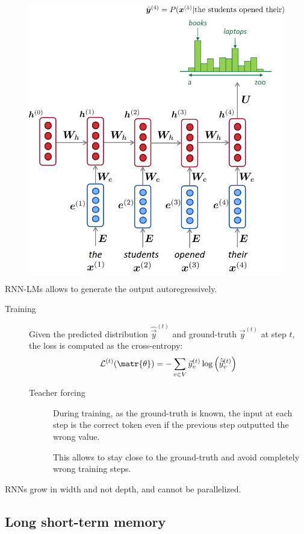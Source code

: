 \begin{description}
    \begin{figure}[H]
        \centering
        \includegraphics[width=0.4\linewidth]{./img/rnn_lm.png}
    \end{figure}

    \begin{remark}
        RNN-LMs allows to generate the output autoregressively.
    \end{remark}

    \begin{description}
        \item[Training]
            Given the predicted distribution $\hat{\vec{y}}^{(t)}$ and ground-truth $\vec{y}^{(t)}$ at step $t$, the loss is computed as the cross-entropy:
            \[ \mathcal{L}^{(t)}(\matr{\theta}) = - \sum_{v \in V} \vec{y}_v^{(t)} \log\left( \hat{\vec{y}}_v^{(t)} \right) \]

            \begin{description}
                \item[Teacher forcing] 
                    During training, as the ground-truth is known, the input at each step is the correct token even if the previous step outputted the wrong value.

                    \begin{remark}
                        This allows to stay close to the ground-truth and avoid completely wrong training steps.
                    \end{remark}
            \end{description}
    \end{description}
\end{description}

\begin{remark}
    RNNs grow in width and not depth, and cannot be parallelized.
\end{remark}


\subsection{Long short-term memory}

